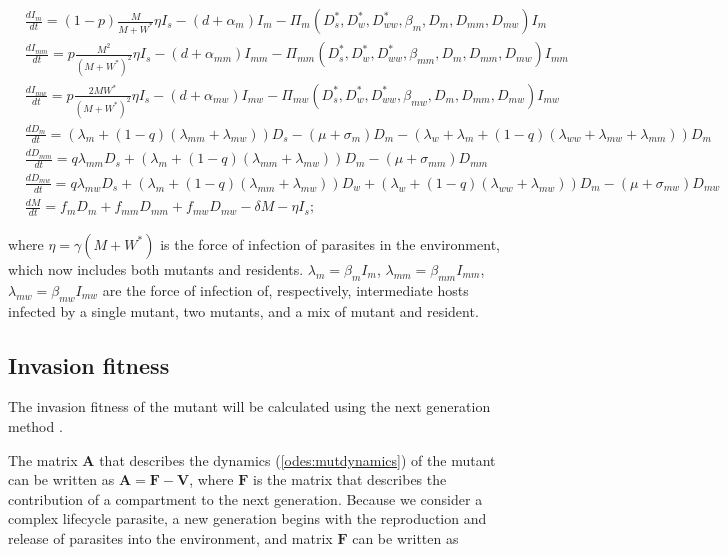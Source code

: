 \documentclass{article}
\begin{document}
\begin{subequations}
\begin{align}
& \frac{dI_m}{dt} = (1 - p) \frac{M}{M + W^*} \eta I_s - (d + \alpha_m) I_m -\Pi_m(D_s^*, D_w^*,  D_{ww}^*,  \beta_m, D_m, D_{mm}, D_{mw}) I_m \\
& \frac{dI_{mm}}{dt} = p \frac{M^2}{(M + W^*)^2} \eta I_s - (d + \alpha_{mm}) I_{mm} - \Pi_{mm}(D_s^*, D_w^*, D_{ww}^*, \beta_{mm}, D_m, D_{mm}, D_{mw}) I_{mm}\\
& \frac{dI_{mw}}{dt} =  p \frac{2 M W^*}{(M + W^*)^2} \eta I_s - (d + \alpha_{mw}) I_{mw} -\Pi_{mw}(D_s^*, D_w^*, D_{ww}^*, \beta_{mw}, D_m, D_{mm}, D_{mw}) I_{mw} \\
& \frac{dD_m}{dt} = ( \lambda_m + (1 - q) (\lambda_{mm} + \lambda_{mw})) D_s - (\mu + \sigma_m) D_m - (\lambda_w + \lambda_m + (1 - q) (\lambda_{ww} + \lambda_{mw} + \lambda_{mm}) ) D_m \\
& \frac{dD_{mm}}{dt} = q \lambda_{mm} D_s + (\lambda_m + (1 - q)(\lambda_{mm} + \lambda_{mw})) D_m - (\mu + \sigma_{mm}) D_{mm} \\
& \frac{dD_{mw}}{dt} = q \lambda_{mw} D_s + (\lambda_m + (1 - q)(\lambda_{mm} + \lambda_{mw})) D_w + (\lambda_w + (1 - q) (\lambda_{ww} + \lambda_{mw})) D_m - (\mu + \sigma_{mw}) D_{mw} \\
& \frac{dM}{dt} = f_m D_m + f_{mm} D_{mm} +  f_{mw} D_{mw} - \delta M - \eta I_s;
\end{align}
\label{odes:mutdynamics}
\end{subequations}

where $\eta =\gamma (M + W^*)$ is the force of infection of parasites in the environment, which now includes both mutants and residents. $\lambda_m = \beta_m I_m$, $\lambda_{mm} = \beta_{mm} I_{mm}$, $\lambda_{mw} = \beta_{mw} I_{mw}$ are the force of infection of, respectively, intermediate hosts infected by a single mutant, two mutants, and a mix of mutant and resident. 

\subsection{Invasion fitness}
The invasion fitness of the mutant will be calculated using the next generation method \citep{hurford:JRSI:2010}.

The matrix $\mathbf{A}$ that describes the dynamics (\ref{odes:mutdynamics}) of the mutant can be written as $\mathbf{A} = \mathbf{F} - \mathbf{V}$, where $\mathbf{F}$ is the matrix that describes the contribution of a compartment to the next generation. Because we consider a complex lifecycle parasite, a new generation begins with the reproduction and release of parasites into the environment, and matrix $\mathbf{F}$ can be written as
\end{document}
